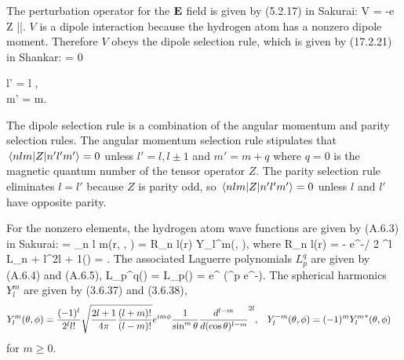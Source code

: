 \begin{solution}
	The perturbation operator for the $\mathbf{E}$ field is given by (5.2.17) in Sakurai:
	\beq
		V = -e Z |\vE|.
	\eeq
	$V$ is a dipole interaction because the hydrogen atom has a nonzero dipole moment.  Therefore $V$ obeys the dipole selection rule, which is given by (17.2.21) in Shankar:
	\beq
		 = 0  \begin{cases} l' = l , \\ m' = m. \end{cases}
	\eeq
	The dipole selection rule is a combination of the angular momentum and parity selection rules.  The angular momentum selection rule stipulates that $\mel{n l m}{Z}{n' l' m'} = 0$ unless $l' = l, l \pm 1$ and $m' = m + q$ where $q = 0$ is the magnetic quantum number of the tensor operator $Z$.  The parity selection rule eliminates $l = l'$ because $Z$ is parity odd, so $\mel{n l m}{Z}{n' l' m'} = 0$ unless $l$ and $l'$ have opposite parity.
	
	For the nonzero elements, the hydrogen atom wave functions are given by (A.6.3) in Sakurai:
	\beq
		 = \psi_{n l m}(r, \tht, \phi) = R_{n l}(r) Y_l^m(\tht, \phi),
	\eeq
	where
	\beqn \label{R}
		R_{n l}(r) = - e^{-\rho / 2} \rho^l L_{n + l}^{2l + 1}(\rho)
		\rho = .
	\eeqn
	The associated Laguerre polynomials $L_p^q$ are given by (A.6.4) and (A.6.5),
	\beqn \label{laguerre}
		L_p^q(\rho) = 
		L_p(\rho) = e^\rho \dv[p]{}{\rho} (\rho^p e^{-\rho}).
	\eeqn
	The spherical harmonics $Y_l^m$ are given by (3.6.37) and (3.6.38),
	\begin{align} \label{harm}
		Y_l^m(\theta, \phi) &= \frac{(-1)^l}{2^l l!} \sqrt{\frac{2l + 1}{4\pi} \frac{(l + m)!}{(l - m)!}} e^{i m \phi} \frac{1}{\sin^m{\theta}} \dv[{l - m}]{}{(\cos\theta)} (\sin\theta)^{2l}, &
		Y_l^{-m}(\theta, \phi) &= (-1)^m {Y_l^m}^*(\theta, \phi)
	\end{align}
	for $m \geq 0$.
	

\end{solution}
